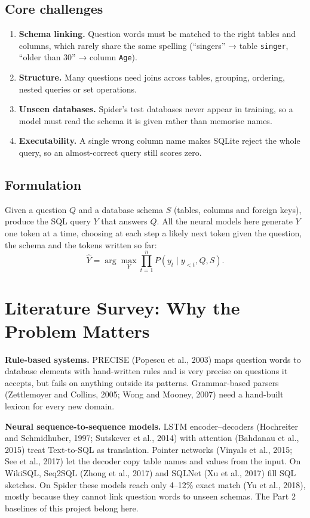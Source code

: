 \documentclass[
  10pt,
]{article}
\providecommand{\tightlist}{%
  \setlength{\itemsep}{0pt}\setlength{\parskip}{0pt}}
\begin{document}
\subsection{Core challenges}\label{core-challenges}

\begin{enumerate}
\def\labelenumi{\arabic{enumi}.}
\tightlist
\item
  \textbf{Schema linking.} Question words must be matched to the right
  tables and columns, which rarely share the same spelling (``singers''
  → table \texttt{singer}, ``older than 30'' → column \texttt{Age}).
\item
  \textbf{Structure.} Many questions need joins across tables, grouping,
  ordering, nested queries or set operations.
\item
  \textbf{Unseen databases.} Spider's test databases never appear in
  training, so a model must read the schema it is given rather than
  memorise names.
\item
  \textbf{Executability.} A single wrong column name makes SQLite reject
  the whole query, so an almost-correct query still scores zero.
\end{enumerate}

\subsection{Formulation}\label{formulation}

Given a question \(Q\) and a database schema \(S\) (tables, columns and
foreign keys), produce the SQL query \(Y\) that answers \(Q\). All the
neural models here generate \(Y\) one token at a time, choosing at each
step a likely next token given the question, the schema and the tokens
written so far:
\[\hat{Y}=\arg\max_Y \prod_{t=1}^{n} P(y_t\mid y_{<t},Q,S).\]

\section{Literature Survey: Why the Problem
Matters}\label{literature-survey-why-the-problem-matters}

\textbf{Rule-based systems.} PRECISE (Popescu et al., 2003) maps
question words to database elements with hand-written rules and is very
precise on questions it accepts, but fails on anything outside its
patterns. Grammar-based parsers (Zettlemoyer and Collins, 2005; Wong and
Mooney, 2007) need a hand-built lexicon for every new domain.

\textbf{Neural sequence-to-sequence models.} LSTM encoder--decoders
(Hochreiter and Schmidhuber, 1997; Sutskever et al., 2014) with
attention (Bahdanau et al., 2015) treat Text-to-SQL as translation.
Pointer networks (Vinyals et al., 2015; See et al., 2017) let the
decoder copy table names and values from the input. On WikiSQL, Seq2SQL
(Zhong et al., 2017) and SQLNet (Xu et al., 2017) fill SQL sketches. On
Spider these models reach only 4--12\% exact match (Yu et al., 2018),
mostly because they cannot link question words to unseen schemas. The
Part 2 baselines of this project belong here.
\end{document}
